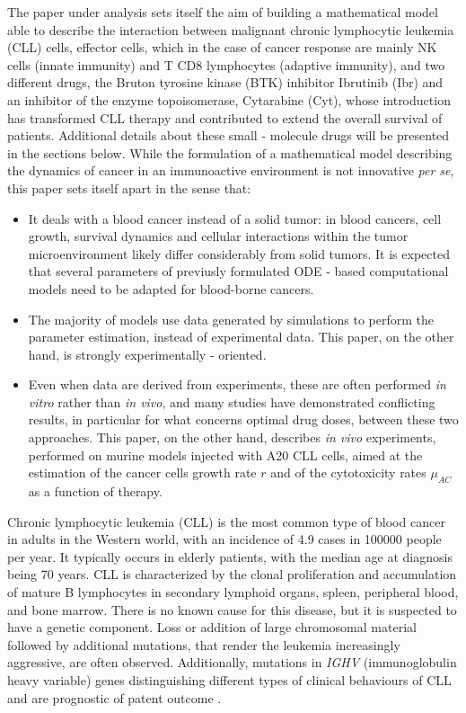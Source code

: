 The paper under analysis sets itself the aim of building a mathematical model able to describe the interaction between malignant chronic lymphocytic leukemia (CLL) cells, effector cells, which in the case of cancer response are mainly NK cells (innate immunity) and T CD8 lymphocytes (adaptive immunity), and two different drugs, the Bruton tyrosine kinase (BTK) inhibitor Ibrutinib (Ibr) and an inhibitor of the enzyme topoisomerase, Cytarabine (Cyt), whose introduction has transformed CLL therapy and contributed to extend the overall survival of patients. Additional details about these small - molecule drugs will be presented in the sections below. While the formulation of a mathematical model describing the dynamics of cancer in an immunoactive environment is not innovative \textit{per se}, this paper sets itself apart in the sense that:
\begin{itemize}
\item It deals with a blood cancer instead of a solid tumor: in blood cancers, cell growth, survival dynamics and cellular interactions within the
tumor microenvironment likely differ considerably from solid tumors. It is expected that several parameters of previusly formulated ODE - based computational models need to be adapted for blood-borne cancers.
\item The majority of models use data generated by simulations to perform the parameter estimation, instead of experimental data. This paper, on the other hand, is strongly experimentally - oriented.
\item Even when data are derived from experiments, these are often performed \textit{in vitro} rather than \textit{in vivo}, and many studies have demonstrated conflicting results, in particular for what concerns optimal drug doses, between these two approaches. This paper, on the other hand, describes \textit{in vivo} experiments, performed on murine models injected with A20 CLL cells, aimed at the estimation of the cancer cells growth rate $r$ and of the cytotoxicity rates $\mu_{AC}$ as a function of therapy. \par
\end{itemize}
\vspace{0.4cm}
Chronic lymphocytic leukemia (CLL) is the most common type of blood cancer in adults in the Western world, with an incidence of 4.9 cases in 100000 people per year. It typically occurs in elderly patients, with the median age at diagnosis being 70 years. CLL is characterized by the clonal proliferation and accumulation of mature B lymphocytes in secondary lymphoid organs, spleen, peripheral blood, and bone marrow. \cite{cll-burger-med, cll-rozman-med}  There is no known cause for this disease, but it is suspected to have a genetic component. Loss or addition of large chromosomal material followed by additional mutations, that render the leukemia increasingly aggressive, are often observed. Additionally, mutations in \textit{IGHV} (immunoglobulin heavy variable) genes distinguishing different types of clinical behaviours of CLL and are prognostic of patent outcome \cite{immunogl-med}. \par
